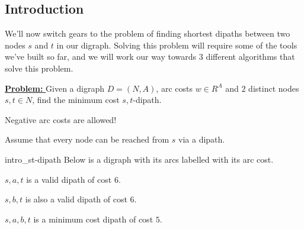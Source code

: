 \subsection{Introduction}

We'll now switch gears to the problem of finding shortest dipaths between two nodes $s$ and $t$ in our digraph.
Solving this problem will require some of the tools we've built so far, and we will work our way towards $3$ different algorithms that solve this problem.

\underline{\textbf{Problem: }}Given a digraph $D = (N,A)$, arc costs $w \in R^A$ and $2$ distinct nodes $s,t \in N$, find the minimum cost $s,t$-dipath.

\begin{note}
    Negative arc costs are allowed!
\end{note}

\begin{remark}
    Assume that every node can be reached from $s$ via a dipath.
\end{remark}

\begin{example}{}{intro_st-dipath}
    Below is a digraph with its arcs labelled with its arc cost.

    \begin{minipage}{\textwidth}
        \centering
    \end{minipage}

    $s,a,t$ is a valid dipath of cost $6$.

    $s,b,t$ is also a valid dipath of cost $6$.

    $s,a,b,t$ is a minimum cost dipath of cost $5$.
\end{example}

